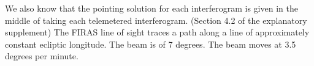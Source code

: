 \documentclass{article}
\begin{document}
We also know that the pointing solution for each interferogram is given in the middle of taking each telemetered interferogram. (Section 4.2 of the explanatory supplement) The FIRAS line of sight traces a path along a line of approximately constant ecliptic longitude. The beam is of 7 degrees. The beam moves at 3.5 degrees per minute. 

%



\end{document}
